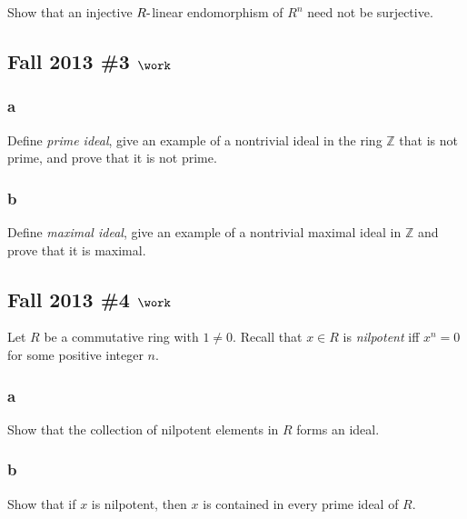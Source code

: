 Show that an injective \(R{\hbox{-}}\)linear endomorphism of \(R^n\)
need not be surjective.

\hypertarget{fall-2013-3-work}{%
\subsection{\texorpdfstring{Fall 2013 \#3
\(\work\)}{Fall 2013 \#3 \textbackslash work}}\label{fall-2013-3-work}}

\hypertarget{a-46}{%
\subsubsection{a}\label{a-46}}

Define \emph{prime ideal}, give an example of a nontrivial ideal in the
ring \({\mathbb{Z}}\) that is not prime, and prove that it is not prime.

\hypertarget{b-36}{%
\subsubsection{b}\label{b-36}}

Define \emph{maximal ideal}, give an example of a nontrivial maximal
ideal in \({\mathbb{Z}}\) and prove that it is maximal.

\hypertarget{fall-2013-4-work}{%
\subsection{\texorpdfstring{Fall 2013 \#4
\(\work\)}{Fall 2013 \#4 \textbackslash work}}\label{fall-2013-4-work}}

Let \(R\) be a commutative ring with \(1\neq 0\). Recall that \(x\in R\)
is \emph{nilpotent} iff \(x^n = 0\) for some positive integer \(n\).

\hypertarget{a-47}{%
\subsubsection{a}\label{a-47}}

Show that the collection of nilpotent elements in \(R\) forms an ideal.

\hypertarget{b-37}{%
\subsubsection{b}\label{b-37}}

Show that if \(x\) is nilpotent, then \(x\) is contained in every prime
ideal of \(R\).

